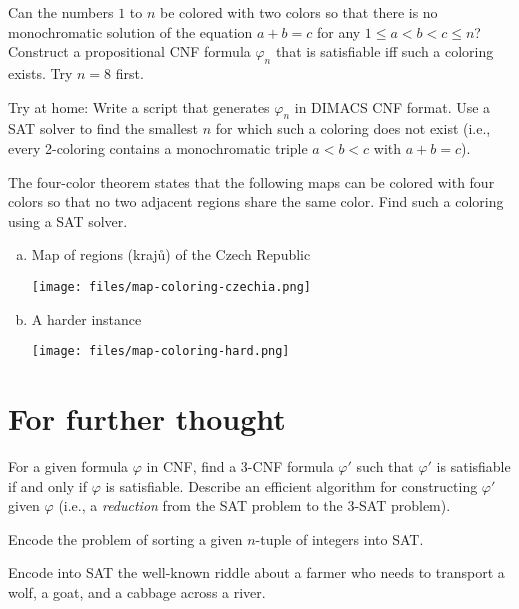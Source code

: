 \begin{problem}
    Can the numbers $1$ to $n$ be colored with two colors so that there is no monochromatic solution of the equation
    $a+b=c$ for any $1\leq a<b<c\leq n$? Construct a propositional CNF formula $\varphi_n$ that is satisfiable iff such a coloring exists. Try $n=8$ first.
    
    Try at home: Write a script that generates $\varphi_n$ in DIMACS CNF format. Use a SAT solver to find the smallest $n$ for which such a coloring does not exist (i.e., every 2-coloring contains a monochromatic triple $a<b<c$ with $a+b=c$).
\end{problem}

    
\begin{problem}

    The four-color theorem states that the following maps can be colored with four colors so that no two adjacent regions share the same color. Find such a coloring using a SAT solver.
    \begin{multicols}{2}
    \begin{enumerate}[(a)]
        \item Map of regions (krajů) of the Czech Republic  
        
        \vfill \texttt{[image: files/map-coloring-czechia.png]} \vfill
        
        \item A harder instance  
        
        \vfill \texttt{[image: files/map-coloring-hard.png]} \vfill
    \end{enumerate}
    \end{multicols}

\end{problem}



\section*{For further thought}
    
    
\begin{problem} 
    
    For a given formula $\varphi$ in CNF, find a 3-CNF formula $\varphi'$ such that $\varphi'$ is satisfiable if and only if $\varphi$ is satisfiable. Describe an efficient algorithm for constructing $\varphi'$ given $\varphi$ (i.e., a \emph{reduction} from the SAT problem to the 3-SAT problem).

\end{problem}


\begin{problem}
    Encode the problem of sorting a given $n$-tuple of integers into SAT.
\end{problem}

\begin{problem}
    Encode into SAT the well-known riddle about a farmer who needs to transport a wolf, a goat, and a cabbage across a river.
\end{problem}


